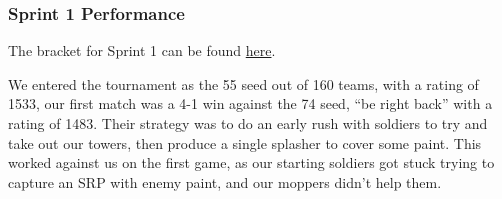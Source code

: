\subsubsection{Sprint 1 Performance}

The bracket for Sprint 1 can be found \href{https://challonge.com/bc25javasprint1}{here}.

\medskip

We entered the tournament as the 55 seed out of 160 teams, with a rating of 1533, our first match was a 4-1 win against the 74 seed, ``be right back'' with a rating of 1483. Their strategy was to do an early rush with soldiers to try and take out our towers, then produce a single splasher to cover some paint. This worked against us on the first game, as our starting soldiers got stuck trying to capture an SRP with enemy paint, and our moppers didn't help them.

\medskip


